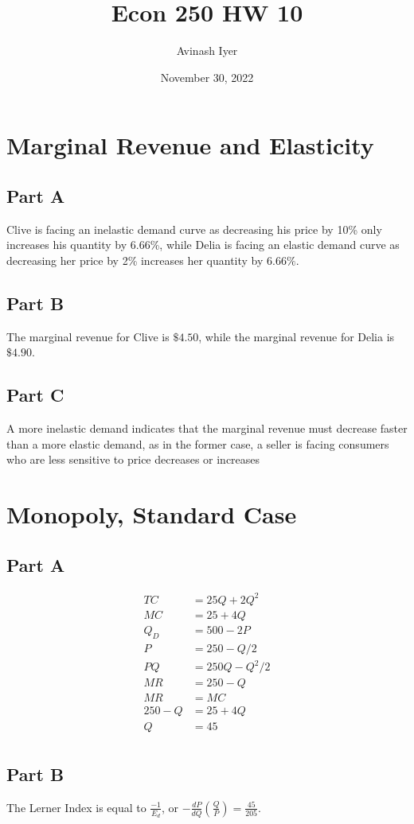 \documentclass[8pt]{extarticle}
\title{Econ 250 HW 10}
\author{Avinash Iyer}
\date{November 30, 2022}
\begin{document}
{
\section*{Marginal Revenue and Elasticity}
\subsection*{Part A}
Clive is facing an inelastic demand curve as decreasing his price by 10\% only increases his quantity by 6.66\%, while Delia is facing an elastic demand curve as decreasing her price by 2\% increases her quantity by $6.66\%$.
\subsection*{Part B}
The marginal revenue for Clive is $\$4.50$, while the marginal revenue for Delia is $\$4.90$.
\subsection*{Part C}
A more inelastic demand indicates that the marginal revenue must decrease faster than a more elastic demand, as in the former case, a seller is facing consumers who are less sensitive to price decreases or increases
\section*{Monopoly, Standard Case}
\subsection*{Part A}
\begin{align*}
	TC &= 25Q + 2Q^2\\
	MC &= 25 + 4Q\\
	Q_D &= 500-2P\\
	P &= 250-Q/2\\
	PQ &= 250Q-Q^2/2\\
	MR &= 250-Q \\
	MR &= MC\\
	250-Q &= 25+4Q\\
	Q &= 45\\
\end{align*}

\subsection*{Part B}
The Lerner Index is equal to $\frac{-1}{E_{d}}$, or $-\frac{dP}{dQ}\left(\frac{Q}{P}\right) = \frac{45}{205}$.
}
\end{document}

